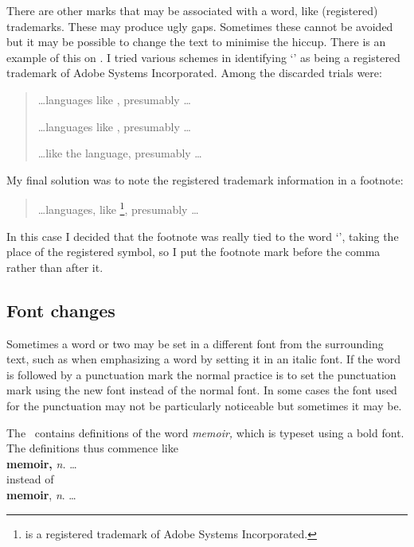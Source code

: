 \documentclass[10pt,letterpaper,extrafontsizes]{memoir}
\begin{document}
   There are other marks that may be associated with a word, like 
(registered) trademarks. These may produce ugly gaps. Sometimes these
cannot be avoided but it may be possible to change the text to minimise
the hiccup. There is an example of this on . I tried various
schemes in identifying `\pscript' as being a registered trademark of
Adobe Systems Incorporated. Among the discarded trials were:
\begin{quote}
\ldots languages like \pscript\texttrademark, presumably \ldots

\ldots languages like \pscript\textsuperscript{\textregistered}, presumably \ldots

\ldots like the \pscript\textsuperscript{\textregistered}{} language, presumably \ldots

\end{quote}
My final solution was to note the registered trademark information in
a footnote:
\begin{quote}
\ldots languages, like \pscript\footnote{\pscript{} is a registered 
trademark of Adobe Systems Incorporated.}, presumably \ldots
\end{quote}
In this case I decided that the footnote was really tied to the word
`\pscript', taking the place of the registered symbol, so I put the
footnote mark before the comma rather than after it.

\subsection{Font changes}


    Sometimes a word or two may be set in a different font from the 
surrounding text, such as when emphasizing 
a word by setting it in an
italic font. If the word is followed by a punctuation mark the normal
practice is to set the punctuation mark using the new font instead of 
the normal
font. In some cases the font used for the punctuation may not be
particularly noticeable but sometimes it may be. 

    The \pixfrontmatter\ contains definitions of the word \textit{memoir,}
which is typeset using a bold font. The definitions thus commence like \\
\hspace*{2em} \textbf{memoir,} \textit{n.} \ldots \\
instead of \\
\hspace*{2em} \textbf{memoir}, \textit{n}. \ldots 
\end{document}
